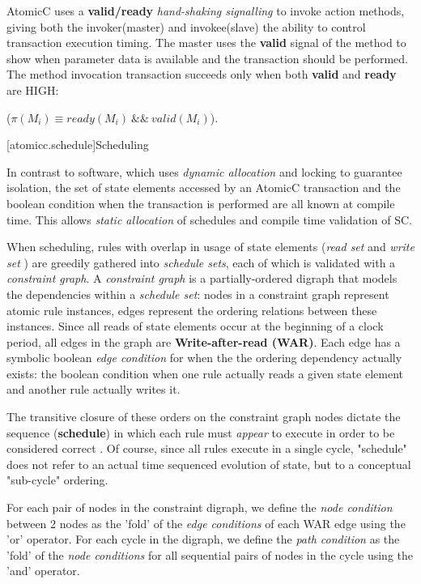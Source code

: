 AtomicC uses a \textbf{valid/ready} \textit{hand-shaking signalling}
\cite{Fletcher2009, AXISpec} to invoke action methods,
giving both the invoker(master) and invokee(slave) the ability to control transaction
execution timing.
The master uses the \textbf{valid} signal
of the method to show when parameter data is available and the transaction should be performed.
The method invocation transaction succeeds only when
both \textbf{valid} and \textbf{ready} are HIGH:

 ($\pi(M_{i}) \equiv ready(M_{i})\ \&\&\ valid(M_{i})$).

[atomicc.schedule]{Scheduling}

In contrast to software, which uses \textit{dynamic allocation}\cite[p.~377]{GrayR93}
and locking\cite[Sec.~11.2]{OV11} to guarantee isolation,
the set of state elements accessed by an AtomicC transaction
and the boolean condition when the transaction is performed
are all known at compile time.
This allows \textit{static allocation}\cite[Sec.~7.3.1]{GrayR93} of schedules
and compile time validation of SC.

When scheduling, rules with overlap in usage of state elements
(\textit{read set} and \textit{write set}\cite[Sec.~10.1.2]{OV11} \cite{RosenkrantzSternsLewis})
are greedily gathered into \textit{schedule sets}, each of which is
validated with a \textit{constraint graph}.
A \textit{constraint graph} is a partially-ordered digraph that models
the dependencies within a \textit{schedule set}:
nodes in a constraint graph represent atomic rule instances, edges
represent the ordering relations between these instances\cite[Sec.~3]{Cain2003}.
Since all reads of state elements occur at the beginning of a clock period,
all edges in the graph are \textbf{Write-after-read (WAR)}.
Each edge has a symbolic boolean \textit{edge condition} for when the
the ordering dependency actually exists: the boolean
condition when one rule actually reads a given state element
and another rule actually writes it.

The transitive closure of these orders on the constraint graph nodes
dictate the sequence (\textbf{schedule}) in which each rule must \textit{appear} to execute in
order to be considered correct
\cite[Sec.~11.1]{OV11}.
Of course, since all rules execute in a single cycle, "schedule" does not
refer to an actual time sequenced evolution of state,
but to a conceptual "sub-cycle" ordering.

For each pair of nodes in the constraint digraph, we define the \textit{node condition}
between 2 nodes as the 'fold' of the \textit{edge conditions} of each WAR edge
using the 'or' operator.
For each cycle in the digraph, we define the \textit{path condition}
as the 'fold' of the \textit{node conditions} for all sequential pairs of nodes
in the cycle using the 'and' operator.

